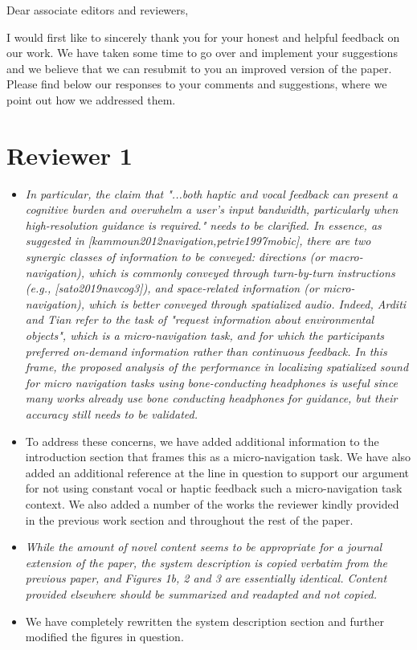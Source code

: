 \documentclass{article}
\begin{document}
\noindent Dear associate editors and reviewers,

I would first like to sincerely thank you for your honest and helpful feedback on our work.
We have taken some time to go over and implement your suggestions and we believe that we can resubmit to you an improved version of the paper. 
Please find below our responses to your comments and suggestions, where we point out how we addressed them.

\section*{Reviewer 1} 

\begin{itemize}
  \item \textit{In particular, the claim that "...both haptic and vocal feedback can present a cognitive burden and overwhelm a user’s input bandwidth, particularly when high-resolution guidance is required." needs to be clarified.
      In essence, as suggested in [kammoun2012navigation,petrie1997mobic], there are two synergic classes of information to be conveyed: directions (or macro-navigation), which is commonly conveyed through turn-by-turn instructions (e.g., [sato2019navcog3]), and space-related information (or micro-navigation), which is better conveyed through spatialized audio.
      Indeed, Arditi and Tian refer to the task of "request information about environmental objects", which is a micro-navigation task, and for which the participants preferred on-demand information rather than continuous feedback.
In this frame, the proposed analysis of the performance in localizing spatialized sound for micro navigation tasks using bone-conducting headphones is useful since many works already use bone conducting headphones for guidance, but their accuracy still needs to be validated.
}
  \item[] \noindent To address these concerns, we have added additional information to the introduction section that frames this as a micro-navigation task.
    We have also added an additional reference at the line in question to support our argument for not using constant vocal or haptic feedback such a micro-navigation task context.
    We also added a number of the works the reviewer kindly provided in the previous work section and throughout the rest of the paper. 

  \item \textit{While the amount of novel content seems to be appropriate for a journal extension of the paper, the system description is copied verbatim from the previous paper, and Figures 1b, 2 and 3 are essentially identical. Content provided elsewhere should be summarized and readapted and not copied.}
  \item []We have completely rewritten the system description section and further modified the figures in question.


\end{itemize}
\end{document}
